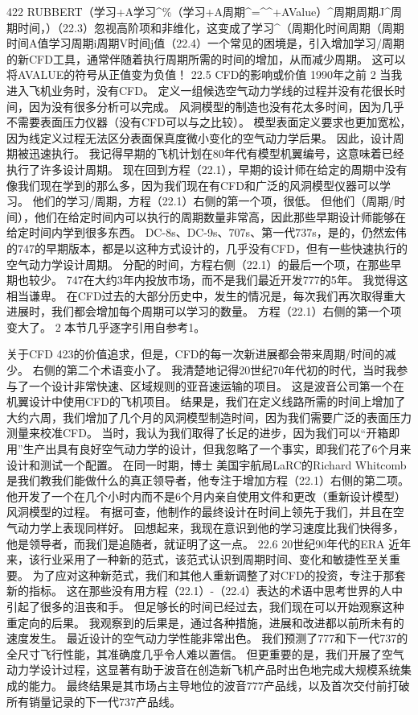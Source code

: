 \documentclass[UTF8,11pt,a4paper,openany,fontset=fandol]{ctexbook}
\begin{document}
422 RUBBERT（学习+A学习\textasciicircum{}\%（学习+A周期\textasciicircum{}=\textasciicircum{}\textasciicircum{}+AValue）\textasciicircum{}周期周期J\textasciicircum{}周期时间，）（22.3）忽视高阶项和非维化，这变成了学习\textasciicircum{}（周期化时间周期（周期时间A值学习周期i周期V时间j值（22.4）一个常见的困境是，引入增加学习/周期的新CFD工具，通常伴随着执行周期所需的时间的增加，从而减少周期。 这可以将AVALUE的符号从正值变为负值！ 22.5 CFD的影响或价值 1990年之前 2 当我进入飞机业务时，没有CFD。 定义一组候选空气动力学线的过程并没有花很长时间，因为没有很多分析可以完成。 风洞模型的制造也没有花太多时间，因为几乎不需要表面压力仪器（没有CFD可以与之比较）。 模型表面定义要求也更加宽松，因为线定义过程无法区分表面保真度微小变化的空气动力学后果。 因此，设计周期被迅速执行。 我记得早期的飞机计划在80年代有模型机翼编号，这意味着已经执行了许多设计周期。 现在回到方程（22.1），早期的设计师在给定的周期中没有像我们现在学到的那么多，因为我们现在有CFD和广泛的风洞模型仪器可以学习。 他们的学习/周期，方程（22.1）右侧的第一个项，很低。 但他们（周期/时间），他们在给定时间内可以执行的周期数量非常高，因此那些早期设计师能够在给定时间内学到很多东西。 DC-8s、DC-9s、707s、第一代737s，是的，仍然宏伟的747的早期版本，都是以这种方式设计的，几乎没有CFD，但有一些快速执行的空气动力学设计周期。 分配的时间，方程右侧（22.1）的最后一个项，在那些早期也较少。 747在大约3年内投放市场，而不是我们最近开发777的5年。 我觉得这相当谦卑。 在CFD过去的大部分历史中，发生的情况是，每次我们再次取得重大进展时，我们都会增加每个周期可以学习的数量。 方程（22.1）右侧的第一个项变大了。 2 本节几乎逐字引用自参考1。

关于CFD 423的价值追求，但是，CFD的每一次新进展都会带来周期/时间的减少。 右侧的第二个术语变小了。 我清楚地记得20世纪70年代初的时代，当时我参与了一个设计非常快速、区域规则的亚音速运输的项目。 这是波音公司第一个在机翼设计中使用CFD的飞机项目。 结果是，我们在定义线路所需的时间上增加了大约六周，我们增加了几个月的风洞模型制造时间，因为我们需要广泛的表面压力测量来校准CFD。 当时，我认为我们取得了长足的进步，因为我们可以“开箱即用”生产出具有良好空气动力学的设计，但我忽略了一个事实，即我们花了6个月来设计和测试一个配置。 在同一时期，博士 美国宇航局LaRC的Richard Whitcomb是我们教我们能做什么的真正领导者，他专注于增加方程（22.1）右侧的第二项。 他开发了一个在几个小时内而不是6个月内亲自使用文件和更改（重新设计模型）风洞模型的过程。 有据可查，他制作的最终设计在时间上领先于我们，并且在空气动力学上表现同样好。 回想起来，我现在意识到他的学习速度比我们快得多，他是领导者，而我们是追随者，就证明了这一点。 22.6 20世纪90年代的ERA 近年来，该行业采用了一种新的范式，该范式认识到周期时间、变化和敏捷性至关重要。 为了应对这种新范式，我们和其他人重新调整了对CFD的投资，专注于那套新的指标。 这在那些没有用方程（22.1）-（22.4）表达的术语中思考世界的人中引起了很多的沮丧和手。 但足够长的时间已经过去，我们现在可以开始观察这种重定向的后果。 我观察到的后果是，通过各种措施，进展和改进都以前所未有的速度发生。 最近设计的空气动力学性能非常出色。 我们预测了777和下一代737的全尺寸飞行性能，其准确度几乎令人难以置信。 但更重要的是，我们开展了空气动力学设计过程，这显著有助于波音在创造新飞机产品时出色地完成大规模系统集成的能力。 最终结果是其市场占主导地位的波音777产品线，以及首次交付前打破所有销量记录的下一代737产品线。
\end{document}
